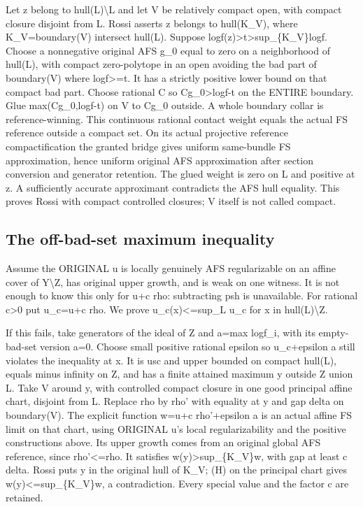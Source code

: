 \documentclass[
  10pt,
]{article}
\begin{document}
Let z belong to hull(L)\textbackslash L and let V be relatively compact
open, with compact closure disjoint from L. Rossi asserts z belongs to
hull(K\_V), where K\_V=boundary(V) intersect hull(L). Suppose
log\textbar f(z)\textbar\textgreater t\textgreater sup\_\{K\_V\}log\textbar f\textbar.
Choose a nonnegative original AFS g\_0 equal to zero on a neighborhood
of hull(L), with compact zero-polytope in an open avoiding the bad part
of boundary(V) where log\textbar f\textbar\textgreater=t. It has a
strictly positive lower bound on that compact bad part. Choose rational
C so Cg\_0\textgreater log\textbar f\textbar-t on the ENTIRE boundary.
Glue max(Cg\_0,log\textbar f\textbar-t) on V to Cg\_0 outside. A whole
boundary collar is reference-winning. This continuous rational contact
weight equals the actual FS reference outside a compact set. On its
actual projective reference compactification the granted bridge gives
uniform same-bundle FS approximation, hence uniform original AFS
approximation after section conversion and generator retention. The
glued weight is zero on L and positive at z. A sufficiently accurate
approximant contradicts the AFS hull equality. This proves Rossi with
compact controlled closures; V itself is not called compact.

\subsection{The off-bad-set maximum
inequality}\label{the-off-bad-set-maximum-inequality}

Assume the ORIGINAL u is locally genuinely AFS regularizable on an
affine cover of Y\textbackslash Z, has original upper growth, and is
weak on one witness. It is not enough to know this only for u+c rho:
subtracting psh is unavailable. For rational c\textgreater0 put u\_c=u+c
rho. We prove u\_c(x)\textless=sup\_L u\_c for x in
hull(L)\textbackslash Z.

If this fails, take generators of the ideal of Z and a=max
log\textbar f\_i\textbar, with its empty-bad-set version a=0. Choose
small positive rational epsilon so u\_c+epsilon a still violates the
inequality at x. It is usc and upper bounded on compact hull(L), equals
minus infinity on Z, and has a finite attained maximum y outside Z union
L. Take V around y, with controlled compact closure in one good
principal affine chart, disjoint from L. Replace rho by rho' with
equality at y and gap delta on boundary(V). The explicit function w=u+c
rho'+epsilon a is an actual affine FS limit on that chart, using
ORIGINAL u's local regularizability and the positive constructions
above. Its upper growth comes from an original global AFS reference,
since rho'\textless=rho. It satisfies w(y)\textgreater sup\_\{K\_V\}w,
with gap at least c delta. Rossi puts y in the original hull of K\_V;
(H) on the principal chart gives w(y)\textless=sup\_\{K\_V\}w, a
contradiction. Every special value and the factor c are retained.
\end{document}
